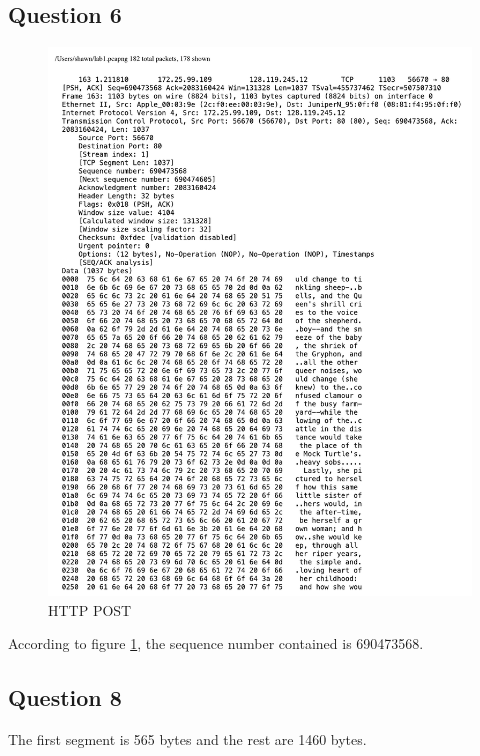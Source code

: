 \documentclass[titlepage, paper=a4, fontsize=11pt]{scrartcl} %
\numberwithin{equation}{section} %
\numberwithin{figure}{section} %
\numberwithin{table}{section} %
\begin{document}
\subsection*{Question 6}
\begin{figure}[!ht]
    \centering
    \includegraphics[width=\textwidth]{images/lab1-q6.pdf}
    \caption{HTTP POST}
    \label{fig:tcp-http-post}
\end{figure}
According to figure \ref{fig:tcp-http-post}, the sequence number contained is 690473568. \\

\subsection*{Question 8}
The first segment is 565 bytes and the rest are 1460 bytes. \\
\end{document}

